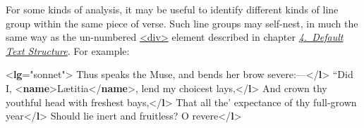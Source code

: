 For some kinds of analysis, it may be useful to identify different kinds of line group within the same piece of verse. Such line groups may self-nest, in much the same way as the un-numbered \hyperref[TEI.div]{<div>} element described in chapter \textit{\hyperref[DS]{4.\ Default Text Structure}}. For example: \par\bgroup{}\exampleFont \begin{shaded}\noindent\mbox{}{<\textbf{lg}\hspace*{1em}{type}="{sonnet}">}\mbox{}\newline 
{}\mbox{}\newline 
\hspace*{1em}Thus speaks the Muse, and bends her brow severe:—{</\textbf{l}>}\mbox{}\newline 
\hspace*{1em}“Did I, {<\textbf{name}>}Lætitia{</\textbf{name}>}, lend my choicest lays,{</\textbf{l}>}\mbox{}\newline 
\hspace*{1em}And crown thy youthful head with freshest bays,{</\textbf{l}>}\mbox{}\newline 
\hspace*{1em}That all the' expectance of thy full-grown year{</\textbf{l}>}\mbox{}\newline 
\hspace*{1em}Should lie inert and fruitless? O revere{</\textbf{l}>}\mbox{}\newline 

\end{shaded}
